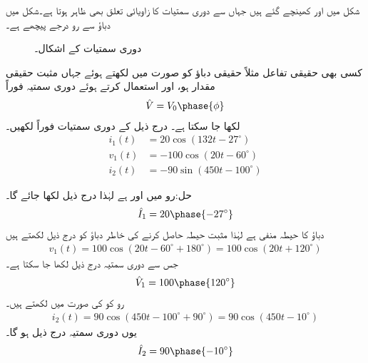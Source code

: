 شکل  میں  اور  کھینچے گئے ہیں جہاں سے دوری سمتیات کا زاویائی تعلق بھی ظاہر ہوتا ہے۔شکل  میں دباؤ سے رو  درجے پیچھے ہے۔
\begin{figure}
\centering
{}
\caption{دوری سمتیات کے اشکال۔}
\label{شکل_بدلتا_دوری_سمتیات}
\end{figure}

کسی بھی حقیقی تفاعل مثلاً حقیقی دباؤ کو  صورت میں لکھتے ہوئے جہاں  مثبت حقیقی مقدار ہو،  اور  استعمال کرتے ہوئے دوری سمتیہ فوراً
\begin{align}
\hat{V}=V_0\phase{\phi}
\end{align}
لکھا جا سکتا ہے۔
درج ذیل کے دوری سمتیات فوراً لکھیں۔
\begin{align*}
i_1(t)&=20\cos(132t-27^{\circ}) \\
 v_1(t)&=-100\cos(20t-60^{\circ})\\
 i_2(t)&=-90\sin(450t-100^{\circ})
\end{align*}

حل:رو  میں  اور  ہے لہٰذا درج ذیل لکھا جائے گا۔
\begin{align*}
\hat{I}_1=20\phase{-27^{\circ}}
\end{align*}
دباؤ کا حیطہ منفی ہے لہٰذا مثبت حیطہ حاصل کرنے کی خاطر دباؤ کو درج ذیل لکھتے ہیں
\begin{align*}
v_1(t)=100\cos(20t-60^{\circ}+180^{\circ})=100\cos(20t+120^{\circ})
\end{align*}
جس سے دوری سمتیہ درج ذیل لکھا جا سکتا ہے۔
\begin{align*}
\hat{V}_1=100\phase{120^{\circ}}
\end{align*}
رو  کو  کی صورت میں لکھتے ہیں۔
\begin{align*}
i_2(t)=90\cos(450t-100^{\circ}+90^{\circ})=90\cos(450t-10^{\circ})
\end{align*}
یوں دوری سمتیہ درج ذیل ہو گا۔
\begin{align*}
\hat{I}_2=90\phase{-10^{\circ}}
\end{align*}

